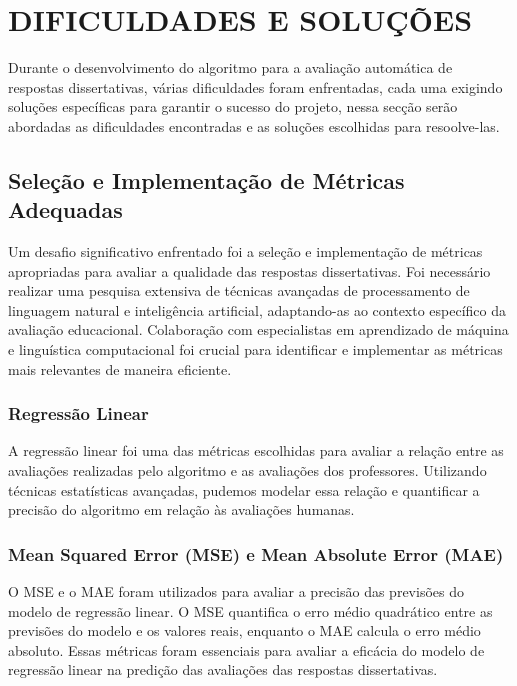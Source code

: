 \chapter{DIFICULDADES E SOLUÇÕES}

Durante o desenvolvimento do algoritmo para a avaliação automática de respostas dissertativas, várias dificuldades foram enfrentadas, cada uma exigindo soluções específicas para garantir o sucesso do projeto, nessa secção serão abordadas as dificuldades encontradas e as soluções escolhidas para resoolve-las.

\section{Seleção e Implementação de Métricas Adequadas}

Um desafio significativo enfrentado foi a seleção e implementação de métricas apropriadas para avaliar a qualidade das respostas dissertativas. Foi necessário realizar uma pesquisa extensiva de técnicas avançadas de processamento de linguagem natural e inteligência artificial, adaptando-as ao contexto específico da avaliação educacional. Colaboração com especialistas em aprendizado de máquina e linguística computacional foi crucial para identificar e implementar as métricas mais relevantes de maneira eficiente.

\subsection{Regressão Linear}

A regressão linear foi uma das métricas escolhidas para avaliar a relação entre as avaliações realizadas pelo algoritmo e as avaliações dos professores. Utilizando técnicas estatísticas avançadas, pudemos modelar essa relação e quantificar a precisão do algoritmo em relação às avaliações humanas.

\subsection{Mean Squared Error (MSE) e Mean Absolute Error (MAE)}

O MSE e o MAE foram utilizados para avaliar a precisão das previsões do modelo de regressão linear. O MSE quantifica o erro médio quadrático entre as previsões do modelo e os valores reais, enquanto o MAE calcula o erro médio absoluto. Essas métricas foram essenciais para avaliar a eficácia do modelo de regressão linear na predição das avaliações das respostas dissertativas.

